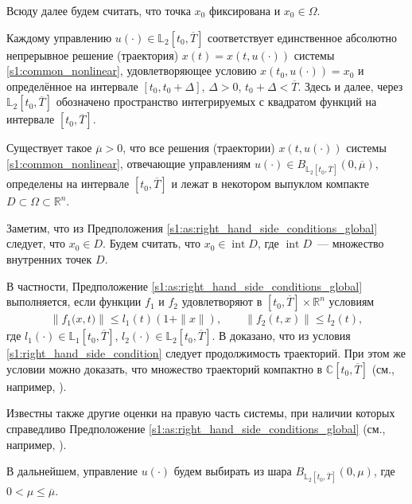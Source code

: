 \documentclass[../main.tex]{subfiles}
\begin{document}
Всюду далее будем считать, что точка $x_0$ фиксирована и $x_0 \in \Omega $. 
 
Каждому управлению $ u(\cdot) \in \mathbb{L}_2[t_0, \overline{T}] $ соответствует единственное абсолютно непрерывное решение (траектория) $ x(t)=x(t,u(\cdot)) $ системы \eqref{s1:common_nonlinear}, удовлетворяющее условию $ x(t_0, u(\cdot)) = x_0$ и определённое на интервале $ [t_0, t_0 + \Delta] $, $\Delta > 0$, $ t_0 + \Delta < \overline{T}$.
Здесь и далее, через $\mathbb{L}_2[t_0, \overline{T}] $ обозначено пространство интегрируемых с квадратом функций на интервале $[t_0, \overline{T}]$. 

\begin{assumption}\label{s1:as:right_hand_side_conditions_global}
 Существует такое $\overline{\mu} > 0 $, что все решения (траектории) $ x(t, u(\cdot)) $ системы \eqref{s1:common_nonlinear}, отвечающие управлениям $u(\cdot) \in B_{\mathbb{L}_2[t_0, \overline{T}]}(0,\overline{\mu})$, определены на интервале $ [t_0,\overline{T}] $ и лежат в некотором выпуклом компакте $D \subset \Omega \subset \mathbb{R}^n$. 
\end{assumption}
 
Заметим, что из Предположения \ref{s1:as:right_hand_side_conditions_global} следует, что $x_0 \in D$. 
Будем считать, что $x_0 \in \operatorname{int} D$, где $\operatorname{int} D $~--- множество внутренних точек $D$.

В частности, Предположение \ref{s1:as:right_hand_side_conditions_global} выполняется, если функции $f_1$ и $f_2$ удовлетворяют в $ [t_0, \overline{T}] \times \mathbb{R}^n$ условиям
\begin{gather}\label{s1:right_hand_side_condition}
 \left\|f_1\big(x,t\big) \right\| \leqslant l_1(t) (1 + \|x\|), \qquad \left\| f_2(t,x) \right\| \leqslant l_2(t), 
\end{gather}
где $ l_1(\cdot) \in \mathbb{L}_1[t_0, \overline{T}] $, $ l_2(\cdot) \in \mathbb{L}_2[t_0, \overline{T}]$.
В \cite[Теорема 5]{Filippov2} доказано, что из условия \eqref{s1:right_hand_side_condition} следует продолжимость траекторий. 
При этом же условии можно доказать, что множество траекторий компактно в $\mathbb{C}[t_0, \overline{T}]$ (см., например, \cite{GusZyk, Guseinov2022}).
 
Известны также другие оценки на правую часть системы, при наличии которых справедливо Предположение \ref{s1:as:right_hand_side_conditions_global} (см., например, \cite{Filippov2, Guseinov2010}).
 
В дальнейшем, управление $ u(\cdot) $ будем выбирать из шара $ B_{\mathbb{L}_2[t_0, \overline{T}]}(0,\mu) $, где $ 0 < \mu \leqslant \overline{\mu} $.
 
\end{document}
